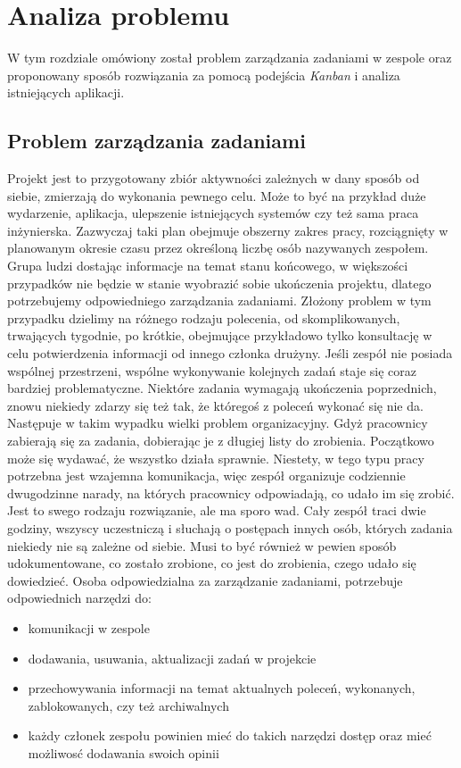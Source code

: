 
\chapter{Analiza problemu}
\thispagestyle{chapterBeginStyle}

W tym rozdziale omówiony został problem zarządzania zadaniami w zespole oraz proponowany sposób rozwiązania za pomocą podejścia \textit{Kanban} i analiza istniejących aplikacji.
\section{Problem zarządzania zadaniami}

Projekt jest to przygotowany zbiór aktywności zależnych w dany sposób od siebie, zmierzają do wykonania pewnego celu. Może to być na przykład duże wydarzenie, aplikacja, ulepszenie istniejących systemów czy też sama praca inżynierska. Zazwyczaj taki plan obejmuje obszerny zakres pracy, rozciągnięty w planowanym okresie czasu przez określoną liczbę osób nazywanych zespołem. Grupa ludzi dostając informacje na temat stanu końcowego, w większości przypadków nie będzie w stanie wyobrazić sobie ukończenia projektu, dlatego potrzebujemy odpowiedniego zarządzania zadaniami. Złożony problem w tym przypadku dzielimy na różnego rodzaju polecenia, od skomplikowanych, trwających tygodnie, po krótkie, obejmujące przykładowo tylko konsultację w celu potwierdzenia informacji od innego członka drużyny. Jeśli zespół nie posiada wspólnej przestrzeni, wspólne wykonywanie kolejnych zadań staje się coraz bardziej problematyczne. Niektóre zadania wymagają ukończenia poprzednich, znowu niekiedy zdarzy się też tak, że któregoś z poleceń wykonać się nie da. Następuje w takim wypadku wielki problem organizacyjny.  Gdyż pracownicy zabierają się za zadania, dobierając je z długiej listy do zrobienia. Początkowo może się wydawać, że wszystko działa sprawnie. Niestety, w tego typu pracy potrzebna jest wzajemna komunikacja, więc zespół organizuje codziennie dwugodzinne narady, na których pracownicy odpowiadają, co udało im się zrobić. Jest to swego rodzaju rozwiązanie, ale ma sporo wad. Cały zespół traci dwie godziny, wszyscy uczestniczą i słuchają o postępach innych osób, których zadania niekiedy nie są zależne od siebie. Musi to być również w pewien sposób udokumentowane, co zostało zrobione, co jest do zrobienia, czego udało się dowiedzieć. Osoba odpowiedzialna za zarządzanie zadaniami, potrzebuje odpowiednich narzędzi do:
\begin{itemize}
	\item  komunikacji w zespole
	\item  dodawania, usuwania, aktualizacji zadań w projekcie
	\item  przechowywania informacji na temat aktualnych poleceń, wykonanych, zablokowanych, czy też archiwalnych
	\item każdy członek zespołu powinien mieć do takich narzędzi dostęp oraz mieć możliwosć dodawania swoich opinii
\end{itemize}
